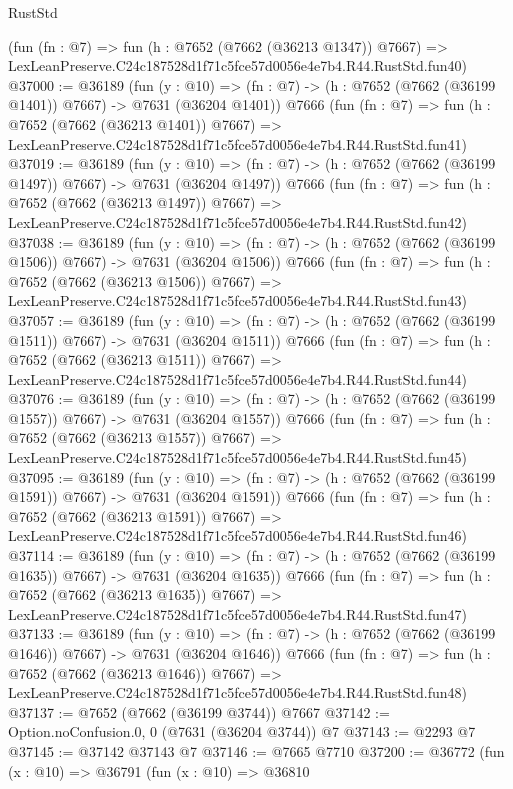 \begin{lexlean}{RustStd}
\begin{coremodule}
    (fun (fn : @7) =>
    fun (h : @7652 (@7662 (@36213 @1347)) @7667) =>
    LexLeanPreserve.C24c187528d1f71c5fce57d0056e4e7b4.R44.RustStd.fun40)
@37000 := @36189
    (fun (y : @10) => (fn : @7) -> (h : @7652 (@7662 (@36199 @1401)) @7667) -> @7631 (@36204 @1401))
    @7666
    (fun (fn : @7) =>
    fun (h : @7652 (@7662 (@36213 @1401)) @7667) =>
    LexLeanPreserve.C24c187528d1f71c5fce57d0056e4e7b4.R44.RustStd.fun41)
@37019 := @36189
    (fun (y : @10) => (fn : @7) -> (h : @7652 (@7662 (@36199 @1497)) @7667) -> @7631 (@36204 @1497))
    @7666
    (fun (fn : @7) =>
    fun (h : @7652 (@7662 (@36213 @1497)) @7667) =>
    LexLeanPreserve.C24c187528d1f71c5fce57d0056e4e7b4.R44.RustStd.fun42)
@37038 := @36189
    (fun (y : @10) => (fn : @7) -> (h : @7652 (@7662 (@36199 @1506)) @7667) -> @7631 (@36204 @1506))
    @7666
    (fun (fn : @7) =>
    fun (h : @7652 (@7662 (@36213 @1506)) @7667) =>
    LexLeanPreserve.C24c187528d1f71c5fce57d0056e4e7b4.R44.RustStd.fun43)
@37057 := @36189
    (fun (y : @10) => (fn : @7) -> (h : @7652 (@7662 (@36199 @1511)) @7667) -> @7631 (@36204 @1511))
    @7666
    (fun (fn : @7) =>
    fun (h : @7652 (@7662 (@36213 @1511)) @7667) =>
    LexLeanPreserve.C24c187528d1f71c5fce57d0056e4e7b4.R44.RustStd.fun44)
@37076 := @36189
    (fun (y : @10) => (fn : @7) -> (h : @7652 (@7662 (@36199 @1557)) @7667) -> @7631 (@36204 @1557))
    @7666
    (fun (fn : @7) =>
    fun (h : @7652 (@7662 (@36213 @1557)) @7667) =>
    LexLeanPreserve.C24c187528d1f71c5fce57d0056e4e7b4.R44.RustStd.fun45)
@37095 := @36189
    (fun (y : @10) => (fn : @7) -> (h : @7652 (@7662 (@36199 @1591)) @7667) -> @7631 (@36204 @1591))
    @7666
    (fun (fn : @7) =>
    fun (h : @7652 (@7662 (@36213 @1591)) @7667) =>
    LexLeanPreserve.C24c187528d1f71c5fce57d0056e4e7b4.R44.RustStd.fun46)
@37114 := @36189
    (fun (y : @10) => (fn : @7) -> (h : @7652 (@7662 (@36199 @1635)) @7667) -> @7631 (@36204 @1635))
    @7666
    (fun (fn : @7) =>
    fun (h : @7652 (@7662 (@36213 @1635)) @7667) =>
    LexLeanPreserve.C24c187528d1f71c5fce57d0056e4e7b4.R44.RustStd.fun47)
@37133 := @36189
    (fun (y : @10) => (fn : @7) -> (h : @7652 (@7662 (@36199 @1646)) @7667) -> @7631 (@36204 @1646))
    @7666
    (fun (fn : @7) =>
    fun (h : @7652 (@7662 (@36213 @1646)) @7667) =>
    LexLeanPreserve.C24c187528d1f71c5fce57d0056e4e7b4.R44.RustStd.fun48)
@37137 := @7652 (@7662 (@36199 @3744)) @7667
@37142 := Option.noConfusion.{0, 0} (@7631 (@36204 @3744)) @7
@37143 := @2293 @7
@37145 := @37142 @37143 @7
@37146 := @7665 @7710
@37200 := @36772
    (fun (x : @10) =>
    @36791
      (fun (x : @10) =>
      @36810

\end{coremodule}
\end{lexlean}
